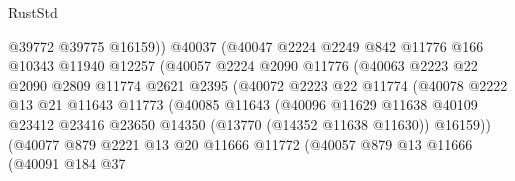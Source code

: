 \begin{lexlean}{RustStd}
\begin{coremodule}
                                @39772
                                @39775
                                @16159))
                            @40037
                            (@40047
                              @2224
                              @2249
                              @842
                              @11776
                              @166
                              @10343
                              @11940
                              @12257
                              (@40057
                                @2224
                                @2090
                                @11776
                                (@40063
                                  @2223
                                  @22
                                  @2090
                                  @2809
                                  @11774
                                  @2621
                                  @2395
                                  (@40072
                                    @2223
                                    @22
                                    @11774
                                    (@40078
                                      @2222
                                      @13
                                      @21
                                      @11643
                                      @11773
                                      (@40085
                                        @11643
                                        (@40096
                                          @11629
                                          @11638
                                          @40109
                                          @23412
                                          @23416
                                          @23650
                                          @14350
                                          (@13770 (@14352 @11638 @11630))
                                          @16159))
                                      (@40077
                                        @879
                                        @2221
                                        @13
                                        @20
                                        @11666
                                        @11772
                                        (@40057
                                          @879
                                          @13
                                          @11666
                                          (@40091
                                            @184
                                            @37

\end{coremodule}
\end{lexlean}
